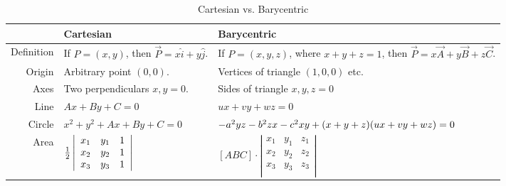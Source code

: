 \documentclass{scrartcl}
\begin{document}
\newcommand{\tableskip}{0.4cm}
\begin{table}[h]
  \centering
  \begin{tabular}{r|p{}|p{}}
    & Cartesian & Barycentric \\ \hline
    Definition & If $P=(x,y)$, then $\vec P = x \hat i + y \hat j$. & If $P=(x,y,z)$, where $x+y+z=1$, then $\vec P = x \vec A + y \vec B + z \vec C$. \\[\tableskip]
    Origin & Arbitrary point $(0,0)$. & Vertices of triangle $(1,0,0)$ etc. \\[\tableskip]
    Axes & Two perpendiculars $x,y=0$. & Sides of triangle $x,y,z=0$ \\[\tableskip]
    Line & $Ax + By + C = 0$ & $ux + vy + wz = 0$ \\[\tableskip]
    Circle & $x^2+y^2+Ax+By+C = 0$ & $-a^2yz-b^2zx-c^2xy \newline + (x+y+z)(ux+vy+wz)=0$ \\[\tableskip]
    Area & $\frac{1}{2} \left|
    \begin{array}{ccc}
      x_1 & y_1 & 1 \\
      x_2 & y_2 & 1 \\
      x_3 & y_3 & 1
    \end{array}
    \right|$ &
    $[ABC] \cdot \left|
    \begin{array}{ccc}
      x_1 & y_1 & z_1 \\
      x_2 & y_2 & z_2 \\
      x_3 & y_3 & z_3 \\
    \end{array}
    \right|$
  \end{tabular}
  \caption{Cartesian vs. Barycentric}
  \label{tab:compare}
\end{table}

\eject
\end{document}
